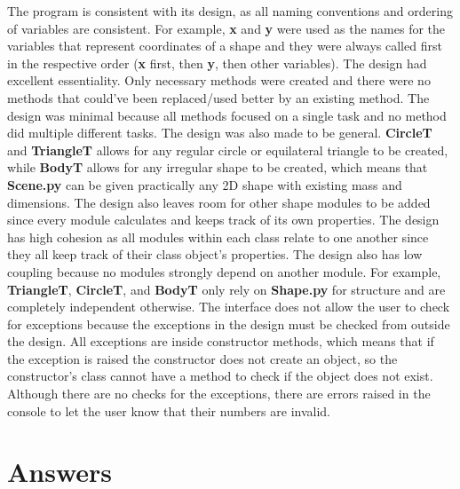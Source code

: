 \documentclass[12pt]{article}
\begin{document}
	The program is consistent with its design, as all naming conventions and ordering of variables are consistent. For example, \textbf{x} and \textbf{y} were used as the names for the variables that represent coordinates of a shape and they were always called first in the respective order (\textbf{x} first, then \textbf{y}, then other variables). The design had excellent essentiality. Only necessary methods were created and there were no methods that could’ve been replaced/used better by an existing method. The design was minimal because all methods focused on a single task and no method did multiple different tasks. The design was also made to be general. \textbf{CircleT} and \textbf{TriangleT} allows for any regular circle or equilateral triangle to be created, while \textbf{BodyT} allows for any irregular shape to be created, which means that \textbf{Scene.py} can be given practically any 2D shape with existing mass and dimensions. The design also leaves room for other shape modules to be added since every module calculates and keeps track of its own properties. The design has high cohesion as all modules within each class relate to one another since they all keep track of their class object’s properties. The design also has low coupling because no modules strongly depend on another module. For example, \textbf{TriangleT}, \textbf{CircleT}, and \textbf{BodyT} only rely on \textbf{Shape.py} for structure and are completely independent otherwise. The interface does not allow the user to check for exceptions because the exceptions in the design must be checked from outside the design. All exceptions are inside constructor methods, which means that if the exception is raised the constructor does not create an object, so the constructor’s class cannot have a method to check if the object does not exist. Although there are no checks for the exceptions, there are errors raised in the console to let the user know that their numbers are invalid. 

\section{Answers}
\end{document}
